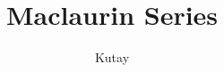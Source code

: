 \documentclass{beamer}
\title{Maclaurin Series}
\author{Kutay}
\institute{Made with LaTeX}
\begin{document}
\begin{frame}
  \titlepage
\end{frame}
\end{document}
